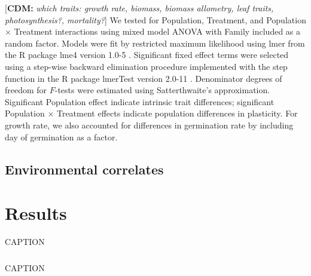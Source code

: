 \documentclass[11pt, oneside]{article}
\newcommand{\cdm}[1]{{ \color{magenta} [{\bf{CDM:}} {\em#1}]}} %
\begin{document}
\cdm{which traits: growth rate, biomass, biomass allometry, leaf traits, photosynthesis?, mortality?}
We tested for Population, Treatment, and Population $\times$ Treatment interactions using mixed model ANOVA with Family included as a random factor. Models were fit by restricted maximum likelihood using lmer from the R package lme4 version 1.0-5 \citep{Bates_etal_2013}. Significant fixed effect terms were selected using a step-wise backward elimination procedure implemented with the step function in the R package lmerTest version 2.0-11 \citep{Kuznetsova_etal_2014}. Denominator degrees of freedom for $F$-tests were estimated using Satterthwaite's approximation. Significant Population effect indicate intrinsic trait differences; significant Population $\times$ Treatment effects indicate population differences in plasticity. For growth rate, we also accounted for differences in germination rate by including day of germination as a factor.


\subsection*{Environmental correlates}


\section*{Results}

\begin{table}[htbp]
	\fontsize{10}{12}
	\selectfont
	\caption[ANOVA table, leaf expansion rate]{CAPTION}
	\begin{center}
	\begin{tabular}{lcccccc}
	\toprule

	

	\bottomrule
	\end{tabular}
	\end{center}
\end{table}

\begin{table}[htbp]
	\fontsize{10}{12}
	\selectfont
	\caption[ANOVA table, stem expansion rate]{CAPTION}
	\begin{center}
	\begin{tabular}{lcccccc}
	\toprule

	

	\bottomrule
	\end{tabular}
	\end{center}
\end{table}
\end{document}

